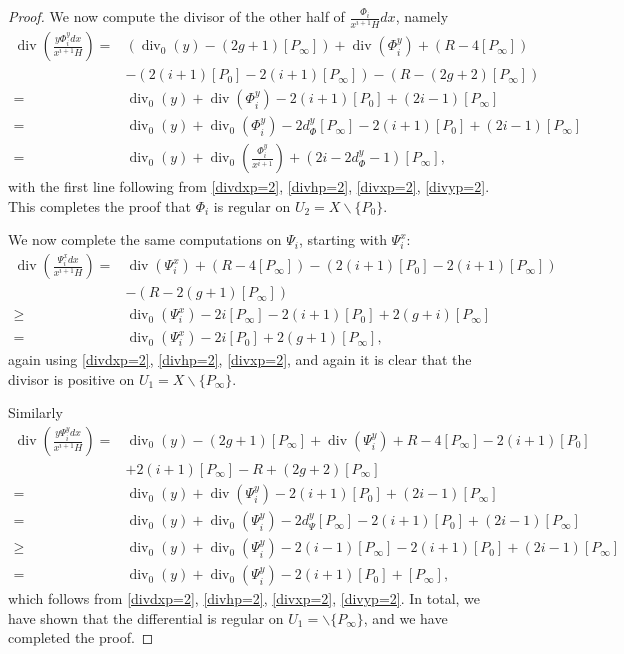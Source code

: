 \documentclass[draft, 11pt]{article} %
\theoremstyle{plain}
\theoremstyle{remark}
\DeclareMathOperator{\di}{div}
\begin{document}
\begin{proof}
We now compute the divisor of the other half of $\frac{\Phi_i}{x^{i+1}H}dx$, namely
\begin{align*}
\di\left(\frac{y\Phi_i^y dx}{x^{i+1}H} \right)  = & (\di_0(y) - (2g+1)[P_\infty]) + \di(\Phi_i^y) + (R - 4[P_\infty])\\
& -(2(i+1)[P_0] - 2(i+1)[P_\infty]) - (R  - (2g+2)[P_\infty]) \\
 = & \di_0(y) + \di(\Phi_i^y) -2(i+1)[P_0] + (2i -1)[P_\infty] \\
 = & \di_0(y) + \di_0(\Phi_i^y) - 2d_\Phi^y[P_\infty] - 2(i+1)[P_0] + (2i-1)[P_\infty] \\
 = & \di_0(y) + \di_0\left(\frac{\Phi_i^y}{x^{i+1}} \right) + (2i-2d_\Phi^y -1)[P_\infty],
\end{align*}
with the first line following from \eqref{divdxp=2}, \eqref{divhp=2}, \eqref{divxp=2}, \eqref{divyp=2}.
This completes the proof that $\Phi_i$ is regular on $U_2 = X \backslash \{P_0\}$.

We now complete the same computations on $\Psi_i$, starting with $\Psi_i^x$:
\begin{align*}
\di\left( \frac{\Psi_i^x dx}{x^{i+1}H} \right)  = &  \di(\Psi_i^x) + (R - 4[P_\infty]) - (2(i+1)[P_0] - 2(i+1)[P_\infty])\\
&  - (R - 2(g+1)[P_\infty]) \\
 \geq &  \di_0(\Psi_i^x ) - 2i[P_\infty] - 2(i+1)[P_0] + 2(g+i)[P_\infty] \\
 = &  \di_0(\Psi_i^x) - 2i[P_0] + 2(g+1)[P_\infty],
\end{align*}
again using \eqref{divdxp=2}, \eqref{divhp=2}, \eqref{divxp=2}, and again it is clear that the divisor is positive on $U_1 = X \backslash \{P_\infty\}$.

Similarly
\begin{align*}
\di\left(\frac{y\Psi_i^y dx}{x^{i+1}H} \right)  =  & \di_0(y) - (2g+1)[P_\infty] + \di(\Psi_i^y) + R - 4[P_\infty] -2(i+1)[P_0] \\ 
& + 2(i+1)[P_\infty] - R + (2g+2)[P_\infty] \\
 =  & \di_0(y) + \di(\Psi_i^y) -2(i+1)[P_0] + (2i -1)[P_\infty] \\
 = &  \di_0(y) + \di_0(\Psi_i^y) - 2d_\Psi^y[P_\infty] - 2(i+1)[P_0] + (2i-1)[P_\infty] \\
 \geq &  \di_0(y) + \di_0(\Psi_i^y) -2(i-1)[P_\infty] -2(i+1)[P_0] + (2i-1)[P_\infty] \\
 =   &\di_0(y) + \di_0(\Psi_i^y) -2(i+1)[P_0] + [P_\infty], 
\end{align*}
which follows from \eqref{divdxp=2}, \eqref{divhp=2}, \eqref{divxp=2}, \eqref{divyp=2}.
In total, we have shown that the differential is regular on $U_1 = \backslash \{P_\infty \}$, and we have completed the proof.


\end{proof}
\end{document}

